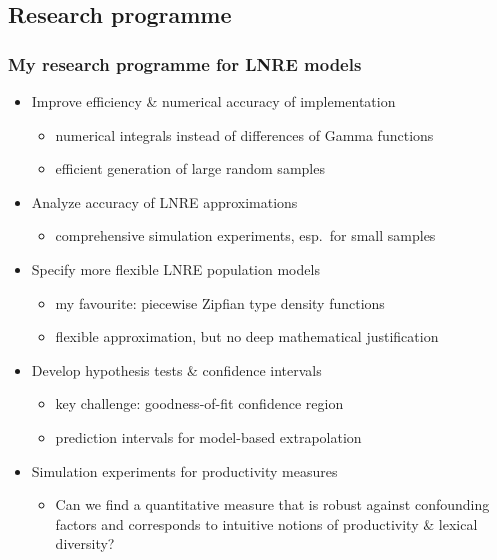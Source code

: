 \documentclass[t]{beamer} %
\begin{document}
\subsection{Research programme}

\begin{frame}
  \frametitle{My research programme for LNRE models}

  \begin{itemize}
  \item<1-> Improve efficiency \& numerical accuracy of implementation
    \begin{itemize}
    \item numerical integrals instead of differences of Gamma functions
    \item efficient generation of large random samples
    \end{itemize}
  \item<2-> Analyze accuracy of LNRE approximations
    \begin{itemize}
    \item comprehensive simulation experiments, esp.\ for small samples
    \end{itemize}
  \item<3-> Specify more flexible LNRE population models
    \begin{itemize}
    \item my favourite: piecewise Zipfian type density functions
    \item flexible approximation, but no deep mathematical justification
    \end{itemize}
  \item<4-> Develop hypothesis tests \& confidence intervals
    \begin{itemize}
    \item key challenge: goodness-of-fit \vs confidence region
    \item prediction intervals for model-based extrapolation
    \end{itemize}
  \item<5-> Simulation experiments for productivity measures
    \begin{itemize}
    \item Can we find a quantitative measure that is robust against confounding factors and corresponds to intuitive notions of productivity \& lexical diversity?
    \end{itemize}
  \end{itemize}
\end{frame}
\end{document}
